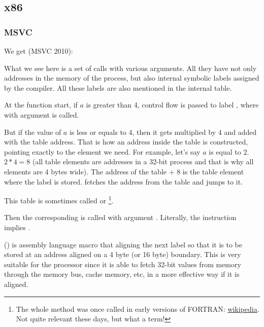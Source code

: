 \subsection{x86}

\subsubsection{\NonOptimizing MSVC}

We get (MSVC 2010):




What we see here is a set of \printf calls with various arguments. 
All they have not only addresses in the memory of the process, but also internal symbolic labels assigned 
by the compiler. 
All these labels are also mentioned in the  internal table.

At the function start, if $a$ is greater than 4, control flow is passed to label 
, where \printf with argument  is called.

But if the value of $a$ is less or equals to 4, then it gets multiplied by 4 and added with the  
table address. That is how an address inside the table is constructed, pointing exactly to the 
element we need. For example, let's say $a$ is equal to 2. $2*4 = 8$ (all table elements 
are addresses in a 32-bit process and that is why all elements are 4 bytes wide). 
The address of the  table + 8 is the table element where the  label is stored.
\JMP fetches the  address from the table and jumps to it.

This table is sometimes called  or \footnote{The whole method was once called 
 in early versions of FORTRAN:
\href{http://go.yurichev.com/17122}{wikipedia}.
Not quite relevant these days, but what a term!}.

Then the corresponding \printf is called with argument .
Literally, the  instruction implies
 .

 () is assembly language macro that aligning the next label so that it is to be stored at an address aligned on a 4 byte
(or 16 byte) boundary.
This is very suitable for the processor since it is able to fetch 32-bit values from memory through the memory bus,
cache memory, etc, in a more effective way if it is aligned.

